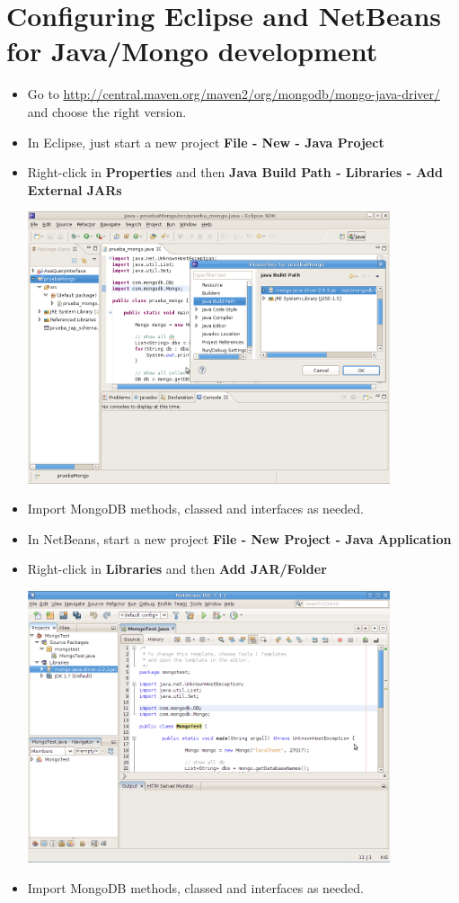 \chapter{Configuring Eclipse and NetBeans for Java/Mongo development}

\begin{itemize}
\item Go to \url{http://central.maven.org/maven2/org/mongodb/mongo-java-driver/} and choose the right version.
\item In Eclipse, just start a new project \textbf{File - New - Java Project}
\item Right-click in \textbf{Properties} and then \textbf{Java Build Path - Libraries - Add External JARs} 

\includegraphics[height=8cm]{images/mongo_eclipse.png}

\item Import MongoDB methods, classed and interfaces as needed.
\item In NetBeans, start a new project \textbf{File - New Project - Java Application}
\item Right-click in \textbf{Libraries} and then \textbf{Add JAR/Folder} 

 \includegraphics[height=8cm]{images/mongo_netbeans.png}

\item Import MongoDB methods, classed and interfaces as needed.
\end{itemize}

